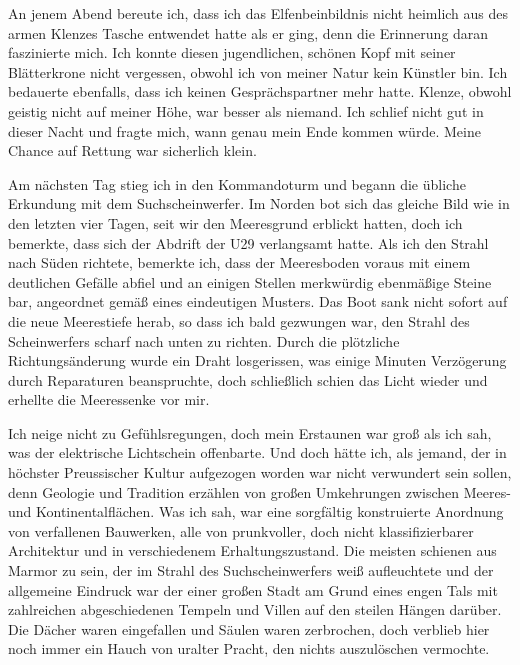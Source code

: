 \documentclass[a4paper]{memoir}
\begin{document}
An jenem Abend bereute ich, dass ich das Elfenbeinbildnis nicht heimlich aus des armen Klenzes Tasche entwendet hatte als er ging, denn die Erinnerung daran faszinierte mich. Ich konnte diesen jugendlichen, schönen Kopf mit seiner Blätterkrone nicht vergessen, obwohl ich von meiner Natur kein Künstler bin. Ich bedauerte ebenfalls, dass ich keinen Gesprächspartner mehr hatte. Klenze, obwohl geistig nicht auf meiner Höhe, war besser als niemand. Ich schlief nicht gut in dieser Nacht und fragte mich, wann genau mein Ende kommen würde. Meine Chance auf Rettung war sicherlich klein.

Am nächsten Tag stieg ich in den Kommandoturm und begann die übliche Erkundung mit dem Suchscheinwerfer. Im Norden bot sich das gleiche Bild wie in den letzten vier Tagen, seit wir den Meeresgrund erblickt hatten, doch ich bemerkte, dass sich der Abdrift der U29 verlangsamt hatte. Als ich den Strahl nach Süden richtete, bemerkte ich, dass der Meeresboden voraus mit einem deutlichen Gefälle abfiel und an einigen Stellen merkwürdig ebenmäßige Steine bar, angeordnet gemäß eines eindeutigen Musters. Das Boot sank nicht sofort auf die neue Meerestiefe herab, so dass ich bald gezwungen war, den Strahl des Scheinwerfers scharf nach unten zu richten. Durch die plötzliche Richtungsänderung wurde ein Draht losgerissen, was einige Minuten Verzögerung durch Reparaturen beanspruchte, doch schließlich schien das Licht wieder und erhellte die Meeressenke vor mir.

Ich neige nicht zu Gefühlsregungen, doch mein Erstaunen war groß als ich sah, was der elektrische Lichtschein offenbarte. Und doch hätte ich, als jemand, der in höchster Preussischer Kultur aufgezogen worden war nicht verwundert sein sollen, denn Geologie und Tradition erzählen von großen Umkehrungen zwischen Meeres- und Kontinentalflächen. Was ich sah, war eine sorgfältig konstruierte Anordnung von verfallenen Bauwerken, alle von prunkvoller, doch nicht klassifizierbarer Architektur und in verschiedenem Erhaltungszustand. Die meisten schienen aus Marmor zu sein, der im Strahl des Suchscheinwerfers weiß aufleuchtete und der allgemeine Eindruck war der einer großen Stadt am Grund eines engen Tals mit zahlreichen abgeschiedenen Tempeln und Villen auf den steilen Hängen darüber. Die Dächer waren eingefallen und Säulen waren zerbrochen, doch verblieb hier noch immer ein Hauch von uralter Pracht, den nichts auszulöschen vermochte.
\end{document}
